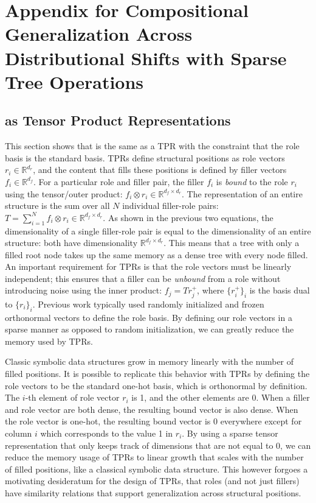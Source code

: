 \chapter{Appendix for Compositional Generalization Across Distributional Shifts with Sparse Tree Operations} \label{chap:appendix-c}

\section{\fullrepname as Tensor Product Representations} \label{sec:sdtm-appendix-sparse-tprs}
This section shows that \fullrepname is the same as a TPR with the constraint that the role basis is the standard basis. TPRs define structural positions as role vectors $r_i \in \mathbb{R}^{d_r}$, and the content that fills these positions is defined by filler vectors $f_i \in \mathbb{R}^{d_f}$. For a particular role and filler pair, the filler $f_i$ is \textit{bound} to the role $r_i$ using the tensor/outer product: $f_i \otimes r_i \in \mathbb{R}^{d_f \times d_r}$. The representation of an entire structure is the sum over all $N$ individual filler-role pairs: $T = \sum_{i=1}^N f_i \otimes r_i  \in \mathbb{R}^{d_f \times d_r}$. As shown in the previous two equations, the dimensionality of a single filler-role pair is equal to the dimensionality of an entire structure: both have dimensionality $\mathbb{R}^{d_f \times d_r}$. This means that a tree with only a filled root node takes up the same memory as a dense tree with every node filled. An important requirement for TPRs is that the role vectors must be linearly independent; this ensures that a filler can be \textit{unbound} from a role without introducing noise using the inner product: $f_j = Tr^+_j$, where $\{r^+_i\}_i$ is the basis dual to $\{r_i\}_i$. Previous work typically used randomly initialized and frozen orthonormal vectors to define the role basis. By defining our role vectors in a sparse manner as opposed to random initialization, we can greatly reduce the memory used by TPRs.

Classic symbolic data structures grow in memory linearly with the number of filled positions.  It is possible to replicate this behavior with TPRs by defining the role vectors to be the standard one-hot basis, which is orthonormal by definition. The $i$-th element of role vector $r_i$ is 1, and the other elements are 0. When a filler and role vector are both dense, the resulting bound vector is also dense. When the role vector is one-hot, the resulting bound vector is 0 everywhere except for column $i$ which corresponds to the value 1 in $r_i$. By using a sparse tensor representation that only keeps track of dimensions that are not equal to 0, we can reduce the memory usage of TPRs to linear growth that scales with the number of filled positions, like a classical symbolic data structure. This however forgoes a motivating desideratum for the design of TPRs, that roles (and not just fillers) have similarity relations that support generalization across structural positions.


